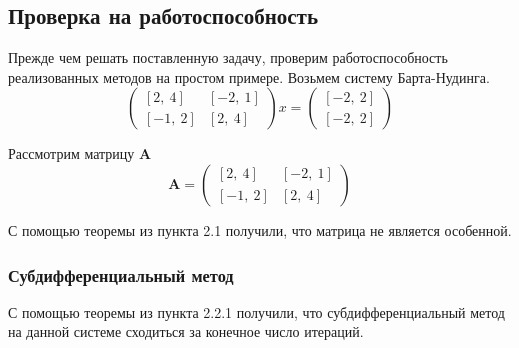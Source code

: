 \documentclass{article}
\begin{document}
    \subsection{Проверка на работоспособность}
    
    Прежде чем решать поставленную задачу, проверим работоспособность реализованных методов на простом примере. Возьмем систему Барта-Нудинга.
    \begin{equation*}
        \begin{pmatrix}
             [2, \ 4] & [-2, \ 1] \\
             [-1, \ 2]  & [2, \ 4] 
        \end{pmatrix}
        x
        =
        \begin{pmatrix}
             [-2, \ 2] \\
             [-2, \ 2] 
        \end{pmatrix}
        
    \end{equation*}
    
    Рассмотрим матрицу \textbf{A}
    \begin{equation*}
        \textbf{A} = \begin{pmatrix}
             [2, \ 4] & [-2, \ 1] \\
             [-1, \ 2]  & [2, \ 4] 
        \end{pmatrix}
    \end{equation*}
    
    С помощью теоремы из пункта 2.1 получили, что матрица не является особенной.
    
    
    \subsubsection{Субдифференциальный метод}
    С помощью теоремы из пункта 2.2.1 получили, что субдифференциальный метод на данной системе сходиться за конечное число итераций.
    
\end{document}

